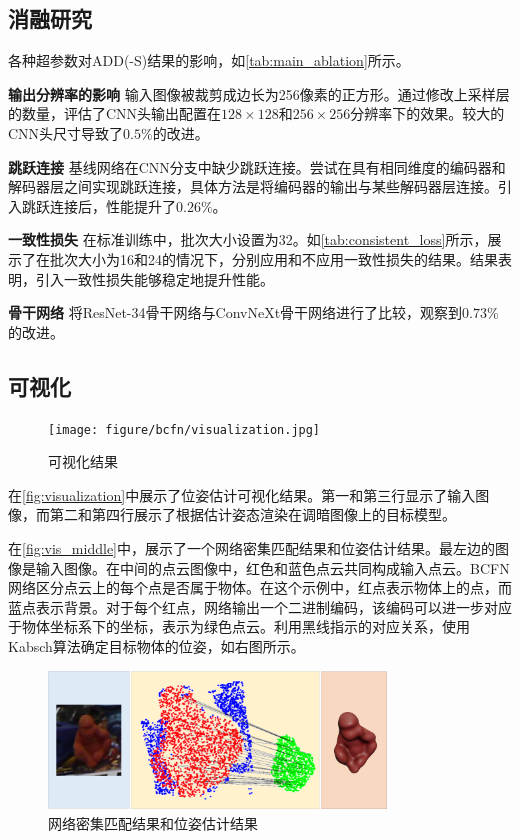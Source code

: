 
\subsection{消融研究}


各种超参数对ADD(-S)结果的影响，如\autoref{tab:main_ablation}所示。

\textbf{输出分辨率的影响 }输入图像被裁剪成边长为256像素的正方形。通过修改上采样层的数量，评估了CNN头输出配置在$128 \times 128$和$256 \times 256$分辨率下的效果。较大的CNN头尺寸导致了$0.5\%$的改进。

\textbf{跳跃连接 } 基线网络在CNN分支中缺少跳跃连接。尝试在具有相同维度的编码器和解码器层之间实现跳跃连接，具体方法是将编码器的输出与某些解码器层连接。引入跳跃连接后，性能提升了$0.26\%$。



\textbf{一致性损失 } 在标准训练中，批次大小设置为32。如\autoref{tab:consistent_loss}所示，展示了在批次大小为16和24的情况下，分别应用和不应用一致性损失的结果。结果表明，引入一致性损失能够稳定地提升性能。

\textbf{骨干网络 } 将ResNet-34骨干网络与ConvNeXt骨干网络进行了比较，观察到$0.73\%$的改进。

\subsection{可视化}

\begin{figure}[htbp]
\centerline{\texttt{[image: figure/bcfn/visualization.jpg]}}
    \caption{可视化结果}
    \label{fig:visualization}
\end{figure}

在\autoref{fig:visualization}中展示了位姿估计可视化结果。第一和第三行显示了输入图像，而第二和第四行展示了根据估计姿态渲染在调暗图像上的目标模型。

在\autoref{fig:vis_middle}中，展示了一个网络密集匹配结果和位姿估计结果。最左边的图像是输入图像。在中间的点云图像中，红色和蓝色点云共同构成输入点云。BCFN网络区分点云上的每个点是否属于物体。在这个示例中，红点表示物体上的点，而蓝点表示背景。对于每个红点，网络输出一个二进制编码，该编码可以进一步对应于物体坐标系下的坐标，表示为绿色点云。利用黑线指示的对应关系，使用Kabsch算法确定目标物体的位姿，如右图所示。

\begin{figure}[htbp]
\centerline{\includegraphics[width=0.80\textwidth]{figure/bcfn/vis_middle.jpg}}
    \caption{网络密集匹配结果和位姿估计结果}
    \label{fig:vis_middle}
\end{figure}
